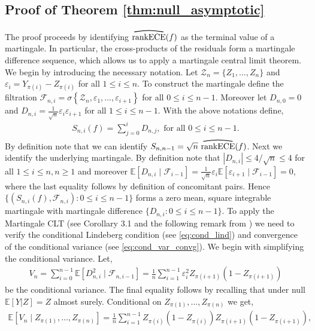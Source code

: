 \documentclass[11pt]{article}
\numberwithin{equation}{section}
\theoremstyle{definition}
\newcommand{\E}{\mathbb{E}}
\newcommand{\cF}{\mathcal{F}}
\newcommand{\sZ}{\mathscr{Z}}
\newcommand{\vep}{\varepsilon}
\newcommand{\myoverline}[2][3.5em]{%
  \overset{%
    \tikz[baseline=-0.1ex]{
      \draw[line width=0.75pt]
        (0,0) .. controls (#1/2,0.5ex) .. (#1,0);
    }%
  }{#2}%
}
\newcommand{\rankECE}{\mathrm{rankECE}}
\newcommand{\hatrankECE}{\myoverline{\rankECE}}
\begin{document}
\subsection{Proof of Theorem \ref{thm:null_asymptotic}}\label{sec:proofof_thm_null_asymptotic}
The proof proceeds by identifying $\hatrankECE(f)$ as the terminal value of a martingale. In particular, the cross-products of the residuals form a martingale difference sequence, which allows us to apply a martingale central limit theorem. We begin by introducing the necessary notation.  Let $\sZ_n = \{Z_1,\ldots, Z_n\}$ and $\vep_i = Y_{\pi(i)} - Z_{\pi(i)}$ for all $1\leq i\leq n$. To construct the martingale define the filtration $\cF_{n,i} = \sigma\left\{\sZ_n, \vep_1,\ldots, \vep_{i+1}\right\}$ for all $0\leq i\leq n-1$. Moreover let $D_{n,0} = 0$ and $D_{n,i} = \frac{1}{\sqrt{n}}\vep_i\vep_{i+1}$ for all $1\leq i\leq n-1$. With the above notations define,
\begin{align*}
    S_{n,i}(f) = \sum_{j=0}^{i}D_{n,j}, \text{ for all }0\leq i\leq n-1.
\end{align*}
By definition note that we can identify $S_{n,n-1} = \sqrt{n}\ \hatrankECE(f)$. Next we identify the underlying martingale. By definition note that $|D_{n,i}|\leq 4/\sqrt{n}\leq 4$ for all $1\leq i\leq n, n\geq 1$ and moreover $\E\left[D_{n,i}\mid \cF_{i-1}\right] = \frac{1}{\sqrt{n}}\vep_i\E\left[\vep_{i+1}\mid \cF_{i-1}\right] = 0$, where the last equality follows by definition of concomitant pairs. Hence $\{\left(S_{n,i}(f), \cF_{n,i}\right):0\leq i\leq n-1\}$ forms a zero mean, square integrable martingale with martingale difference $\{D_{n,i}:0\leq i\leq n-1\}$. To apply the Martingale CLT (see Corollary 3.1 and the following remark from \cite{hall2014martingale}) we need to verify the conditional Lindeberg condition (see \eqref{eq:cond_lind}) and convergence of the conditional variance (see \eqref{eq:cond_var_convg}). We begin with simplifying the conditional variance. Let,
\begin{align*}
    V_n = \sum_{i=0}^{n-1}\E\left[D_{n,i}^2\mid\cF_{n,i-1}\right] = \frac{1}{n}\sum_{i=1}^{n-1}\vep_{i}^2Z_{\pi(i+1)}(1-Z_{\pi(i+1)})
\end{align*}
be the conditional variance. The final equality follows by recalling that under null $\E[Y|Z] = Z$ almost surely. Conditional on $Z_{\pi(1)},\ldots, Z_{\pi(n)}$ we get,
\begin{align*}
    \E\left[V_n\mid Z_{\pi(1)},\ldots, Z_{\pi(n)}\right] = \frac{1}{n}\sum_{i=1}^{n-1}Z_{\pi(i)}(1-Z_{\pi(i)})Z_{\pi(i+1)}(1-Z_{\pi(i+1)}),
\end{align*}
\end{document}
